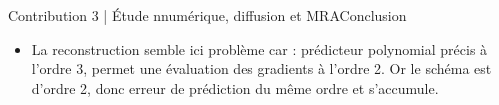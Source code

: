 \begin{frame}{Contribution 3 | Étude nnumérique, diffusion et MRA}{Conclusion}
    \begin{itemize}
    \item La reconstruction semble ici problème car : prédicteur polynomial précis à l'ordre 3, permet une évaluation des 
        gradients à l'ordre 2. Or le schéma est d'ordre 2, donc erreur de prédiction du même ordre et s'accumule.
    \end{itemize}
\end{frame}